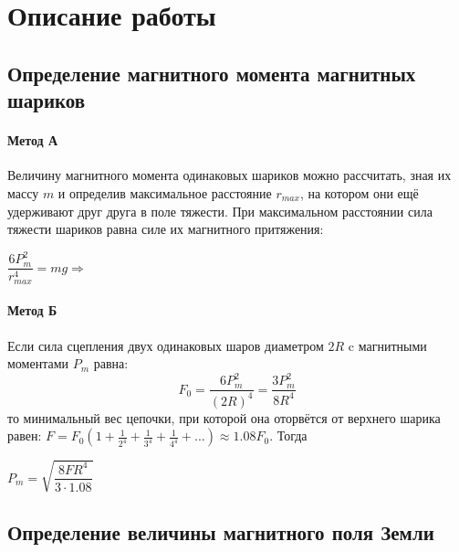 \documentclass[a4paper,12pt]{article}
\begin{document}
\section*{Описание работы}
\subsection*{Определение магнитного момента магнитных шариков}
\paragraph*{Метод А}
Величину магнитного момента одинаковых шариков можно рассчитать, зная их массу $m$ и определив максимальное расстояние $r_{max}$, на котором они ещё удерживают друг друга в поле тяжести. При максимальном расстоянии сила тяжести шариков равна силе их магнитного притяжения:
\begin{center}
$\dfrac{6P_m^2}{r_{max}^4}=mg\Rightarrow$ 
\end{center}
\paragraph*{Метод Б}
Если сила сцепления двух одинаковых шаров диаметром $2R$ c магнитными моментами $P_m$ равна:
$$
F_0 = \dfrac{6P_m^2}{(2R)^4} = \frac{3P_m^2}{8R^4}
$$
то минимальный вес цепочки, при которой она оторвётся от верхнего шарика равен: $F = F_{0}(1 + \frac{1}{2^4} + \frac{1}{3^4} + \frac{1}{4^4} + ...) \approx 1.08 F_0$. Тогда\\
\begin{center}
$P_m = \sqrt{\dfrac{8FR^4}{3\cdot1.08}}$
\end{center}
\subsection*{Определение величины магнитного поля Земли}
\end{document}
